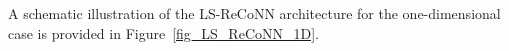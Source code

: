 \documentclass[oneside]{article}
\newcounter{reviewer}
\newcounter{point}[reviewer]
\newtheorem{remark}[theorem]{Remark}
\begin{document}
 A schematic illustration of the LS-ReCoNN architecture for the one-dimensional case is provided in Figure~\ref{fig_LS_ReCoNN_1D}.
\end{document}

